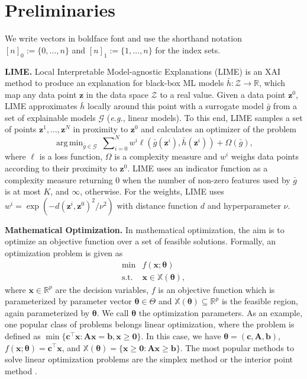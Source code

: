 \documentclass{article}
\DeclareMathOperator*{\argmin}{arg\,min}
\theoremstyle{plain}
\theoremstyle{definition}
\theoremstyle{remark}
\begin{document}
\section{Preliminaries}\label{sec:Preliminaries}
We write vectors in boldface font and use the shorthand notation $[n]_0:=\{0,\dots,n\}$ and $[n]_1:=\{1,\dots,n\}$ for the index sets.

\textbf{LIME.} Local Interpretable Model-agnostic Explanations (LIME) is an XAI method to produce an explanation for black-box ML models $\bar{h}: \mathcal Z \to \mathbb R$, which map any data point $\bm{z}$ in the data space $\mathcal Z$ to a real value. Given a data point $\bm{z}^0$, LIME approximates $\bar{h}$ locally around this point with a surrogate model $\bar{g}$ from a set of explainable models $\mathcal{G}$ (\textit{e.g.}, linear models). To this end, LIME samples a set of points $\bm{z}^1,\ldots , \bm{z}^N$ in proximity to $\bm{z}^0$ and calculates an optimizer of the problem
\begin{equation}
\label{eqn:LIME}
\argmin_{\bar{g}\in\mathcal{G}} \ \sum\nolimits_{i=0}^{N} w^i \ell\left( \bar{g}(\bm{z}^i), \bar{h}(\bm{z}^i)\right)+\Omega(\bar{g}),
\end{equation}
where $\ell$ is a loss function, $\Omega$ is a complexity measure and $w^i$ weighs data points according to their proximity to $\bm{z}^0$. LIME uses an indicator function as a complexity measure returning 0 when the number of non-zero features used by $\bar{g}$ is at most $K$, and $\infty$, otherwise. For the weights, LIME uses  $w^i=\exp(-d(\bm{z}^i,\bm{z}^0)^2/\nu^2)$ with distance function $d$ and hyperparameter $\nu$.

\textbf{Mathematical Optimization.} In mathematical optimization, the aim is to optimize an objective function over a set of feasible solutions. Formally, an optimization problem is given as
\begin{equation}
\label{eqn:sampleproblem}
\begin{array}{ll}
\min & f(\bm{x}; \bm{\theta})\\
 \text{s.t.} & \bm{x} \in \mathbb{X}(\bm{\theta}), 
\end{array}
\end{equation}
where $\bm{x}\in \mathbb{R}^p$ are the decision variables, $f$ is an objective function which is parameterized by parameter vector $\bm{\theta}\in\Theta$ and $\mathbb{X}(\bm{\theta})\subseteq\mathbb{R}^p$ is the feasible region, again parameterized by $\bm{\theta}$. We call $\bm{\theta}$ the optimization parameters. As an example, one popular class of problems belongs linear optimization, where the problem is defined as 
$\min\{\bm{c}^\intercal \bm{x} : \bm{A}\bm{x} = \bm{b}, \bm{x} \geq \bm{0}\}$. In this case, we have $\bm{\theta} = (\bm{c}, \bm{A}, \bm{b})$, $f(\bm{x}; \bm{\theta}) = \bm{c}^\intercal \bm{x}$, and $\mathbb{X}(\bm{\theta}) = \{\bm{x}\ge \bm{0} : \bm{A} \bm{x} \ge  \bm{b}\}$. The most popular methods to solve linear optimization problems are the simplex method or the interior point method \cite{bertsimas1997introduction}.
\end{document}
